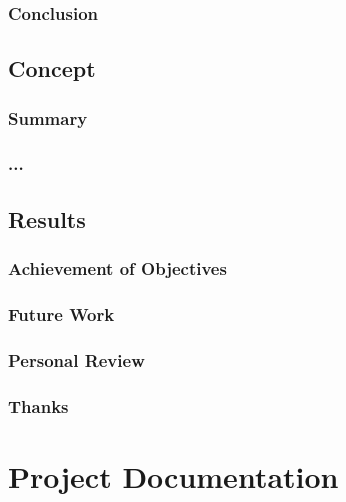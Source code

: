 \documentclass[a4paper,parskip=full]{scrreprt}
\begin{document}
\section{Conclusion}


\chapter{Concept}

\section{Summary}

\section{...}


\chapter{Results}

\section{Achievement of Objectives}

\section{Future Work}

\section{Personal Review}

\section{Thanks}



\part{Project Documentation}
\end{document}
